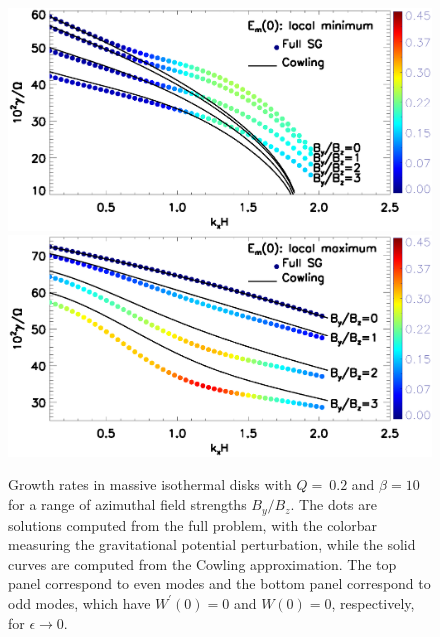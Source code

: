 \begin{figure}
  \includegraphics[width=\linewidth,clip=true,trim=0cm 2cm 0cm
    0cm]{figures/compare_growth3_tilted_even.ps}  
  \includegraphics[width=\linewidth,clip=true,trim=0cm 0cm 0cm
    0.52cm]{figures/compare_growth3_tilted_odd.ps} 
  \caption{Growth rates in massive isothermal disks with $Q=~0.2$ and
    $\beta=10$ for a range of azimuthal field strengths $B_y/B_z$. The
    dots are solutions computed from the full problem, with the
    colorbar measuring the gravitational potential perturbation, while
    the solid curves are computed from the Cowling approximation. The
    top panel correspond to even modes and the
    bottom panel correspond to odd modes, which have
    $W^\prime(0)=0$ and $W(0)=0$, respectively, for $\epsilon\to0$.
    \label{compare_growth3_tilted}}
\end{figure}


